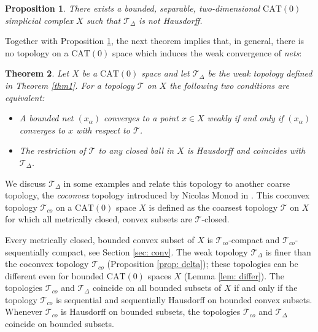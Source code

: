 \documentclass[12pt,leqno]{amsart}
\numberwithin{equation}{section}
\newtheorem{thm}{Theorem}[section]
\newtheorem{prop}[thm]{Proposition}
\theoremstyle{remark}
\newcommand{\CAT}{\mathrm{CAT}}
\begin{document}
\begin{prop} \label{prop: haus}
There exists a bounded, separable, two-dimensional $\CAT(0)$ simplicial complex $X$
such that $\mathcal T_{\Delta}$ is not Hausdorff.
\end{prop} 

Together with Proposition \ref{prop: haus}, the next theorem implies that, in general, there is no topology on a $\CAT(0)$ space which induces the weak convergence of \emph{nets}:

\begin{thm} \label{thm2}
Let $X$ be a $\CAT(0)$ space and let $\mathcal T_{\Delta}$ be the weak topology 	defined in Theorem \ref{thm1}. 
For a topology $\mathcal T$ on $X$ the following two conditions are equivalent:

\begin{itemize}

\item A bounded net $(x_{\alpha})$ converges to a point $x\in X$ weakly if and only if $(x_{\alpha})$ converges to $x$ with respect to $\mathcal T$.

\item The restriction of $\mathcal T$ to any closed ball in $X$ is Hausdorff and coincides with $\mathcal T_{\Delta}$. 

\end{itemize}
\end{thm}

We discuss $\mathcal T_{\Delta}$ in some examples and relate this topology to another coarse topology,
the \emph{coconvex} topology introduced by Nicolas Monod in \cite{Monod}. This coconvex topology $\mathcal T_{co}$ on a $\CAT(0)$ space $X$ is defined as the coarsest topology $\mathcal T$ on $X$ for which all metrically closed, convex subsets are $\mathcal T$-closed. 

Every metrically closed, bounded convex subset of $X$ is $\mathcal T_{co}$-compact and $\mathcal T_{co}$-sequentially compact, see Section \ref{sec: conv}.
The weak topology $\mathcal T_{\Delta}$ is finer than the coconvex topology $\mathcal T_{co}$ (Proposition \ref{prop: delta}); these topologies can be different even for bounded $\CAT(0)$ spaces $X$ (Lemma \ref{lem: differ}).
The topologies $\mathcal T_{co}$ and $\mathcal T_{\Delta}$ coincide on all bounded subsets of $X$ if and only if the topology $\mathcal T_{co}$ is sequential and sequentially Hausdorff on bounded convex subsets. 
Whenever $\mathcal T_{co}$ is Hausdorff on bounded subsets, the topologies $\mathcal T_{co}$ and $\mathcal T_{\Delta}$ coincide on bounded subsets. 
\end{document}
